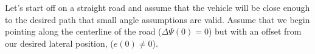 
Let’s start off on a straight road and assume that the vehicle will be close enough to the desired path that small angle
assumptions are valid. Assume that we begin pointing along the centerline of the road ($\Delta \Psi(0) = 0$) but with an offset from our
desired lateral position, ($e(0) \neq 0$).

\vspace*{1cm}
